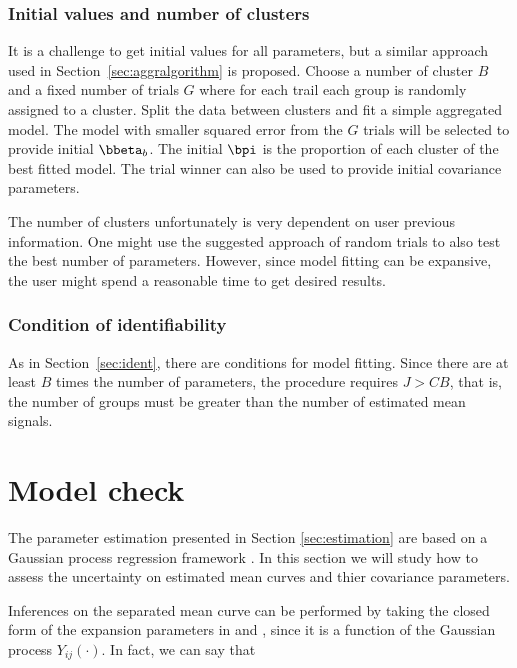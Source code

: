 \subsubsection{Initial values and number of clusters}
\label{sec:init}

It is a challenge to get initial values for all parameters, but a similar approach used in Section~\ref{sec:aggralgorithm} is proposed. Choose a number of cluster $B$ and a fixed number of trials $G$ where for each trail each group is randomly assigned to a cluster. Split the data between clusters and fit a simple aggregated model. The model with smaller squared error from the $G$ trials will be selected to provide initial $\bbeta_b$. The initial $\bpi$ is the proportion of each cluster of the best fitted model. The trial winner can also be used to provide initial covariance parameters.

The number of clusters unfortunately is very dependent on user previous information. One might use the suggested approach of random trials to also test the best number of parameters. However, since model fitting can be expansive, the user might spend a reasonable time to get desired results. 

\subsubsection{Condition of identifiability}
\label{sec:ident2}

As in Section~\ref{sec:ident}, there are conditions for model fitting. Since there are at least  $B$ times the number of parameters, the procedure requires $J > CB$, that is, the number of groups must be greater than the number of estimated mean signals.

\section{Model check}
\label{sec:modelcheck}

The parameter estimation presented in Section \ref{sec:estimation} are based on a Gaussian process regression framework \cite{shi2011gaussian,tresp2001mixtures}. In this section we will study how to assess the uncertainty on estimated mean curves and thier covariance parameters.

Inferences on the separated mean curve can be performed by taking the closed form of the expansion parameters in  and , since it is a function of the Gaussian process $Y_{ij}(\cdot)$. In fact, we can say that


